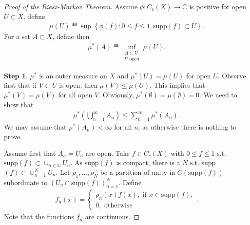 \begin{proof}[Proof of the Riesz-Markov Theorem]
    Assume \(\phi:C_c(X)\rightarrow\mathbb{C}\) is positive for open \(U\subset X\), define
    \begin{align*}
        \mu(U) \eqdef \sup\left\{\phi(f): 0\leq f\leq 1, \text{supp}(f) \subset U\right\}.
    \end{align*}
    For a set \(A\subset X\), define then 
    \begin{align*}
        \mu^*(A) \eqdef \inf_{\substack{A\subset U \\ U\text{ open}}}\mu(U).
    \end{align*}

    \textbf{Step 1}. \(\mu^*\) is an outer measure on \(X\) and \(\mu^*(U)=\mu(U)\) for open \(U\). Observe first that if \(V\subset U\) is open, then \(\mu(V)\leq\mu(U)\). This implies that \(\mu^*(V)=\mu(V)\) for all open \(V\). Obviously, \(\mu^*(\emptyset)=\mu(\emptyset)=0\). We need to show that 
    \begin{align*}
        \mu^*\left(\bigcup\limits_{n=1}^{\infty}A_n\right) \leq \sum\limits_{n=1}^{\infty} \mu^*(A_n).
    \end{align*}
    We may assume that \(\mu^*(A_n)<\infty\) for all \(n\), as otherwise there is nothing to prove.

    Assume first that \(A_n=U_n\) are open. Take \(f\in C_c(X)\) with \(0\leq f\leq 1\) s.t. \(\text{supp}(f)\subset\cup_{n\in\mathbb{N}}U_n\). As supp\((f)\) is compact, there is a \(N\) s.t. supp\((f)\subset \cup_{n=1}^{N}U_n\). Let \(\rho_1, ..., \rho_N\) be a partition of unity  in \(C(\text{supp}(f))\) subordinate to \((U_n\cap\text{supp}(f))_{n=1}^{N}\). Define
    \begin{align*}
        f_n(x) = \begin{cases}
            \rho_n(x)f(x), \text{ if } x\in\text{supp}(f), \\
            0, \text{ otherwise}
        \end{cases}.
    \end{align*}
    Note that the functions \(f_n\) are continuous. 


\end{proof}
